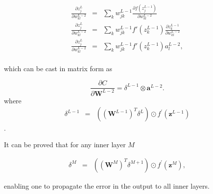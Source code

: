 \documentclass[11pt,onecolumn]{article}
\begin{document}
\begin{eqnarray}
    \frac{\partial z^{L}_j}{\partial w_{kl}^{L-2} } &=& \sum_k w_{jk}^{L-1} \frac{\partial f(z^{L-1}_j)}{\partial  w_{kl}^{L-2}} \\
    \frac{\partial z^{L}_j}{\partial w_{kl}^{L-2} } &=& \sum_k w_{jk}^{L-1}  f'(z^{L-1}_k) \frac{\partial z^{L-1}_k}{\partial  w_{kl}^{L-2}} \\   
    \frac{\partial z^{L}_j}{\partial w_{kl}^{L-2} } &=& \sum_k w_{jk}^{L-1}  f'(z^{L-1}_k) a^{L-2}_l , \\
\end{eqnarray}

which can be cast in matrix form as 

\begin{equation}
    \frac{\partial C}{\partial \mathbf{W}^{L-2}} = \delta^{L-1} \otimes \mathbf{a}^{L-2}. 
\end{equation}
where
\begin{eqnarray}
    \delta^{L-1} &=& \left(\left(\mathbf{W}^{L-1}\right)^{T}\delta^{L} \right) \odot f^{'}\left( \mathbf{z}^{L-1}\right) 
\end{eqnarray}.

It can be proved that for any inner layer $M$

\begin{eqnarray}
    \delta^{M} &=& \left(\left(\mathbf{W}^{M}\right)^{T}\delta^{M+1} \right) \odot f^{'}\left( \mathbf{z}^{M}\right), 
\end{eqnarray}

enabling one to propagate the error in the output to all inner layers. 
\end{document}
